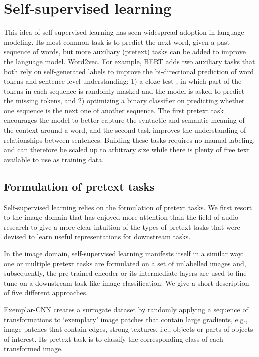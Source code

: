 \section{Self-supervised learning}
This idea of self-supervised learning has seen widespread adoption in language modeling.
Its most common task is to predict the next word, given a past sequence of words, but more auxiliary (pretext) tasks can be added to improve the language model. Word2vec.
For example, BERT \cite{Devlin2019BERTPO} adds two auxiliary tasks that both rely on self-generated labels to improve the bi-directional prediction of word tokens and sentence-level understanding: 1) a cloze test \cite{doi:10.1177/107769905303000401}, in which part of the tokens in each sequence is randomly masked and the model is asked to predict the missing tokens, and 2) optimizing a binary classifier on predicting whether one sequence is the next one of another sequence.
The first pretext task encourages the model to better capture the syntactic and semantic meaning of the context around a word, and the second task improves the understanding of relationships between sentences.
Building these tasks requires no manual labeling, and can therefore be scaled up to arbitrary size while there is plenty of free text available to use as training data.\\

\subsection{Formulation of pretext tasks}
Self-supervised learning relies on the formulation of pretext tasks. We first resort to the image domain that has enjoyed more attention than the field of audio research to give a more clear intuition of the types of pretext tasks that were devised to learn useful representations for downstream tasks.

In the image domain, self-supervised learning manifests itself in a similar way: one or multiple pretext tasks are formulated on a set of unlabelled images and, subsequently, the pre-trained encoder or its intermediate layers are used to fine-tune on a downstream task like image classification.
We give a short description of five different approaches.

Exemplar-CNN \cite{dosovitskiy_discriminative_2014} creates a surrogate dataset by randomly applying a sequence of transformations to `exemplary' image patches that contain large gradients, e.g., image patches that contain edges, strong textures, i.e., objects or parts of objects of interest.
Its pretext task is to classify the corresponding class of each transformed image.

